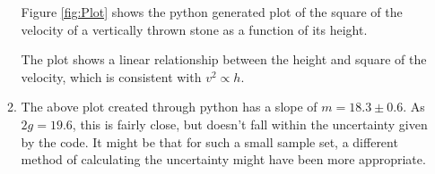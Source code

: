 \documentclass[]{article}
\begin{document}
\begin{enumerate}
\begin{enumerate}[label=(\alph*)]
Figure \ref{fig:Plot} shows the python generated plot of the square of the velocity of a vertically thrown stone as a function of its height.

The plot shows a linear relationship between the height and square of the velocity, which is consistent with $v^2 \propto h$.
\item The above plot created through python has a slope of $m = 18.3 \pm 0.6$. As $2g=19.6$, this is fairly close, but doesn't fall within the uncertainty given by the code. It might be that for such a small sample set, a different method of calculating the uncertainty might have been more appropriate.
\end{enumerate}
\end{enumerate}
\end{document}
